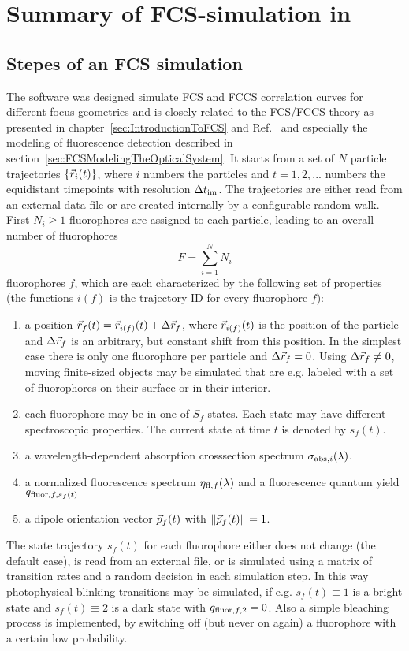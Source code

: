 
\chapter{Summary of FCS-simulation in \df}
\label{sec:SummaryOfDf}
\label{sec:IntroductionToDf}
\section{Stepes of an FCS simulation}
\label{sec:StepesOfAnFCSSimulation}

The software \df was designed simulate FCS and FCCS correlation curves for different focus geometries and is closely related to the FCS/FCCS theory as presented in  chapter~\ref{sec:IntroductionToFCS} and Ref.~\cite{KRIEGERPHD2014} and especially the modeling of fluorescence detection described in section~\ref{sec:FCSModelingTheOpticalSystem}. It starts from a set of $N$ particle trajectories $\{\vec{r}_i(t)\}$, where $i$ numbers the particles and $t=1,2,...$ numbers the equidistant timepoints with resolution $\Delta t_{\text{im}}$. The trajectories are either read from an external data file or are created internally by a configurable random walk. First $N_i\geq 1$ fluorophores are assigned to each particle, leading to an overall number of fluorophores \[  F=\sum\limits_{i=1}^NN_i  \] fluorophores $f$, which are each  characterized by the following set of properties (the functions $i(f)$ is the trajectory ID for every fluorophore $f$):
\begin{enumerate}
	\item a position $\vec{r}_f(t)=\vec{r}_{i(f)}(t)+\Delta\vec{r}_{f}$, where $\vec{r}_{i(f)}(t)$ is the position of the particle and $\Delta\vec{r}_f$ is an arbitrary, but constant shift from this position. In the simplest case there is only one fluorophore per particle and $\Delta\vec{r}_f=0$. Using $\Delta\vec{r}_f\neq0$, moving finite-sized objects may be simulated that are e.g. labeled with a set of fluorophores on their surface or in their interior.
  \item each fluorophore may be in one of $S_f$ states. Each state may have different spectroscopic properties. The current state at time $t$ is denoted by $s_f(t)$. 
  \item a wavelength-dependent absorption crosssection spectrum $\sigma_{{\text{abs}},i}(\lambda)$.
  \item a normalized fluorescence spectrum $\eta_{{\text{fl}},f}(\lambda)$ and a fluorescence quantum yield $q_{{\text{fluor}},f,s_f(t)}$
  \item a dipole orientation vector $\vec{p}_f(t)$ with $\|\vec{p}_f(t)\|_{}=1$.
\end{enumerate}
The state trajectory $s_f(t)$ for each fluorophore either does not change (the default case), is read from an external file, or is simulated using a matrix of transition rates and a random decision in each simulation step. In this way photophysical blinking transitions may be simulated, if e.g. $s_f(t)\equiv1$ is a bright state and $s_f(t)\equiv2$ is a dark state with $q_{{\text{fluor}},f,2}=0$. Also a simple bleaching process is implemented, by switching off (but never on again) a fluorophore with a certain low probability.

